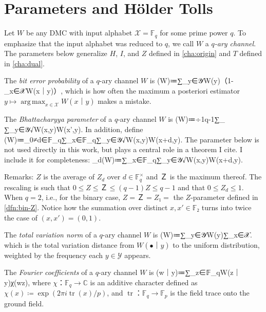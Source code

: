 \documentclass[openany]{amsbook}
\numberwithin{equation}{chapter}
\numberwithin{figure}{chapter}
\numberwithin{table}{chapter}
\DeclareMathOperator\tr{tr}
\DeclareMathOperator*\argmax{arg\,max}
\DeclarePairedDelimiter\abs\lvert\rvert
\def\[#1\]{\begin{equation*}{#1}\end{equation*}}
\theoremstyle{definition}	理dfn:Definition~?s			理exa:Example~?s
\theoremstyle{remark}		理cla:Claim~?s				理rem:Remark~?s
\begin{document}
\section{Parameters and Hölder Tolls}\label{sec:param}

	Let $W$ be any DMC with input alphabet $𝒳=𝔽_q$ for some prime power $q$.
	To emphasize that the input alphabet was reduced to $q$,
	we call $W$ a \emph{$q$-ary channel}.
	The parameters below generalize $H$, $I$, and $Z$ defined in \cref{cha:origin}
	and $T$ defined in \cref{cha:dual}.
	
	\begin{dfn}
		The \emph{bit error probability} of a $q$-ary channel $W$ is
		\[Ｐ(W)≔∑_{y∈𝒴}W(y)（1-\max_{x∈𝒳}W(x｜y)）,\]
		which is how often the maximum a posteriori estimator
		$y↦\argmax_{x∈𝒳}W(x｜y)$ makes a mistake.
	\end{dfn}
	
	\begin{dfn}
		The \emph{Bhattacharyya parameter} of a $q$-ary channel $W$ is
		\[Z(W)≔÷1{q-1}∑_{\substack{x,x'∈𝔽_q\\x≠x'}}
			∑_{y∈𝒴}√{W(x,y)W(x',y)}.\]
		In addition, define
		\[Ｚ(W)≔\max_{0≠d∈𝔽_q}∑_{x∈𝔽_q}∑_{y∈𝒴}√{W(x,y)W(x+d,y)}.\]
		The parameter below is not used directly in this work,
		but plays a central role in a theorem I cite.
		I include it for completeness:
		\[Z_d(W)≔∑_{x∈𝔽_q}∑_{y∈𝒴}√{W(x,y)W(x+d,y)}.\]
	\end{dfn}
	
	Remarks:
	$Z$ is the average of $Z_d$ over $d∈𝔽_q^×$ and $Ｚ$ is the maximum thereof.
	The rescaling is such that $0≤Z≤Ｚ≤(q-1)Z≤q-1$ and that $0≤Z_d≤1$.
	When $q=2$, i.e., for the binary case, $Z=Ｚ=Z₁=$
	the $Z$-parameter defined in \cref{dfn:bin-Z}.
	Notice how the summation over distinct $x,x'∈𝔽₂$
	turns into twice the case of $(x,x')=(0,1)$.
	
	\begin{dfn}
		The \emph{total variation norm} of a $q$-ary channel $W$ is
		\[T(W)≔∑_{y∈𝒴}W(y)∑_{x∈𝒳}\abs[\Big]{W(x｜y)-÷1q}.\]
		which is the total variation distance from $W(•｜y)$ to
		the uniform distribution, weighted by the frequency each $y∈𝒴$ appears.
	\end{dfn}
	
	\begin{dfn}
		The \emph{Fourier coefficients} of a $q$-ary channel $W$ is
		\[M(w｜y)≔∑_{z∈𝔽_q}W(z｜y)χ(wz),\]
		where $χ：𝔽_q→ℂ$ is an additive character defined as $χ(x)≔\exp(2πi\tr(x)/p)$,
		and $\tr：𝔽_q→𝔽_p$ is the field trace onto the ground field.
	\end{dfn}
	
\end{document}
